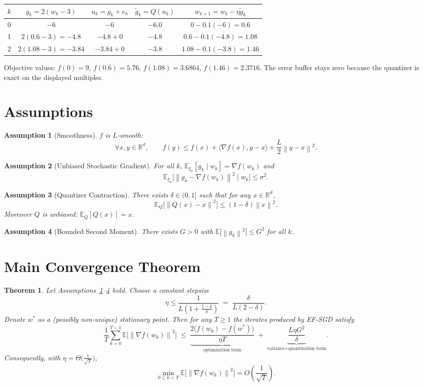 \documentclass{article}
\newtheorem{theorem}{Theorem}
\newtheorem{assumption}{Assumption}
\newcommand{\E}{\mathbb{E}}
\newcommand{\norm}[1]{\left\|#1\right\|}
\newcommand{\ip}[2]{\langle #1,#2\rangle}
\begin{document}
\begin{center}
\begin{tabular}{c|c|c|c|c}
$k$ & $g_k=2(w_k-3)$ & $u_k=g_k+e_k$ & $\tilde g_k=Q(u_k)$ & $w_{k+1}=w_k-\eta\tilde g_k$ \\ \hline
0 & $-6$ & $-6$ & $-6.0$ & $0-0.1(-6)=0.6$ \\
1 & $2(0.6-3)=-4.8$ & $-4.8+0$ & $-4.8$ & $0.6-0.1(-4.8)=1.08$ \\
2 & $2(1.08-3)=-3.84$ & $-3.84+0$ & $-3.8$ & $1.08-0.1(-3.8)=1.46$
\end{tabular}
\end{center}
Objective values: $f(0)=9$, $f(0.6)=5.76$, $f(1.08)=3.6864$, $f(1.46)=2.3716$.
The error buffer stays zero because the quantizer is exact on the
displayed multiples.

\newpage

\section*{Assumptions}
\begin{assumption}[Smoothness]\label{ass:smooth}
$f$ is $L$‑smooth:
\[
\forall x,y\in\mathbb{R}^d,\qquad
f(y)\le f(x)+\ip{\nabla f(x)}{y-x}+\frac{L}{2}\norm{y-x}^2 .
\]
\end{assumption}
\begin{assumption}[Unbiased Stochastic Gradient]\label{ass:unbiased}
For all $k$, $\E_{\xi_k}[g_k\mid w_k]=\nabla f(w_k)$ and
\[
\E_{\xi_k}\!\big[\norm{g_k-\nabla f(w_k)}^2\mid w_k\big]\le\sigma^2 .
\]
\end{assumption}
\begin{assumption}[Quantizer Contraction]\label{ass:quant}
There exists $\delta\in(0,1]$ such that for any $x\in\mathbb{R}^d$,
\[
\E_Q\!\big[\norm{Q(x)-x}^2\big]\le (1-\delta)\norm{x}^2 .
\]
Moreover $Q$ is unbiased: $\E_Q[Q(x)]=x$.
\end{assumption}
\begin{assumption}[Bounded Second Moment]\label{ass:bound}
There exists $G>0$ with $\E\!\big[\norm{g_k}^2\big]\le G^2$ for all $k$.
\end{assumption}

\section*{Main Convergence Theorem}
\begin{theorem}\label{thm:main}
Let Assumptions~\ref{ass:smooth}–\ref{ass:bound} hold.
Choose a constant stepsize 
\[
\eta\le\frac{1}{L(1+\tfrac{1-\delta}{\delta})}
\;=\;\frac{\delta}{L(2-\delta)} .
\]
Denote $w^{*}$ as a (possibly non‑unique) stationary point.
Then for any $T\ge1$ the iterates produced by EF‑SGD satisfy
\[
\frac{1}{T}\sum_{k=0}^{T-1}\E\!\big[\norm{\nabla f(w_k)}^2\big]
\;\le\;
\underbrace{\frac{2\big(f(w_0)-f(w^{*})\big)}{\eta T}}_{\text{optimization term}}
\;+\;
\underbrace{\frac{L\eta G^2}{\delta}}_{\text{variance+quantization term}} .
\tag{3}
\]
Consequently, with $\eta = \Theta\!\big(\tfrac{1}{\sqrt{T}}\big)$,
\[
\min_{0\le k<T}\E\!\big[\norm{\nabla f(w_k)}^2\big]=O\!\left(\frac{1}{\sqrt{T}}\right).
\]
\end{theorem}
\end{document}
